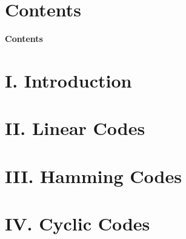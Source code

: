 \documentclass[10pt,aspectratio=1610,compress,dvipsnames]{beamer}
\begin{document}
\begin{frame}
  \titlepage
\end{frame}

\section*{Contents}
\begin{frame}{\textbf{Contents}}
  \tableofcontents
\end{frame}

\section{I. Introduction}


\section{II. Linear Codes}


\section{III. Hamming Codes}


\section{IV. Cyclic Codes}


\end{document}

